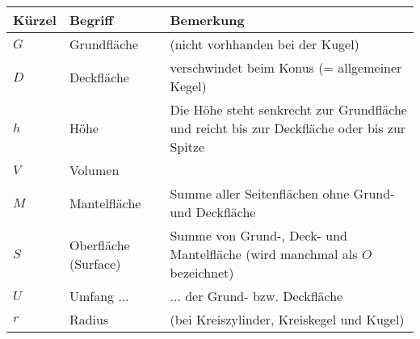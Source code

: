 \begin{tabular}{|l|p{6cm}|p{9cm}|}
  \hline
  Kürzel & Begriff& Bemerkung\\\hline
  $G$  & Grundfläche & (nicht vorhhanden bei der Kugel)\\\hline
  $D$  & Deckfläche & verschwindet beim Konus (= allgemeiner Kegel)\\\hline
  $h$  & Höhe & Die Höhe steht senkrecht zur Grundfläche und reicht bis zur Deckfläche oder bis zur Spitze\\\hline
  $V$  & Volumen & \\\hline
  $M$  & Mantelfläche & Summe aller Seitenflächen ohne Grund- und Deckfläche\\\hline
  $S$  & Oberfläche (Surface)& Summe von Grund-, Deck- und Mantelfläche
  (wird manchmal als $O$ bezeichnet)\\\hline
  $U$  & Umfang ... & ... der Grund- bzw. Deckfläche \\\hline
  $r$  & Radius & (bei Kreiszylinder, Kreiskegel und Kugel)\\\hline
  \end{tabular} 
\newpage
